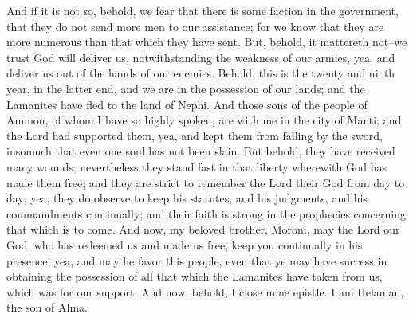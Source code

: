 And if it is not so, behold, we fear that there is some faction in the government, that they do not send more men to our assistance; for we know that they are more numerous than that which they have sent.
\bverse \iffalse But, behold, it mattereth not--we trust God will deliver us, notwithstanding the weakness of our armies, yea, and deliver us out of the hands of our enemies. \fi
But, behold, it mattereth not--we trust God will deliver us, notwithstanding the weakness of our armies, yea, and deliver us out of the hands of our enemies.
\bverse \iffalse Behold, this is the twenty and ninth year, in the latter end, and we are in the possession of our lands; and the Lamanites have fled to the land of Nephi. \fi
Behold, this is the twenty and ninth year, in the latter end, and we are in the possession of our lands; and the Lamanites have fled to the land of Nephi.
\bverse \iffalse And those sons of the people of Ammon, of whom I have so highly spoken, are with me in the city of Manti; and the Lord had supported them, yea, and kept them from falling by the sword, insomuch that even one soul has not been slain. \fi
And those sons of the people of Ammon, of whom I have so highly spoken, are with me in the city of Manti; and the Lord had supported them, yea, and kept them from falling by the sword, insomuch that even one soul has not been slain.
\bverse \iffalse But behold, they have received many wounds; nevertheless they stand fast in that liberty wherewith God has made them free; and they are strict to remember the Lord their God from day to day; yea, they do observe to keep his statutes, and his judgments, and his commandments continually; and their faith is strong in the prophecies concerning that which is to come. \fi
But behold, they have received many wounds; nevertheless they stand fast in that liberty wherewith God has made them free; and they are strict to remember the Lord their God from day to day; yea, they do observe to keep his statutes, and his judgments, and his commandments continually; and their faith is strong in the prophecies concerning that which is to come.
\bverse \iffalse And now, my beloved brother, Moroni, may the Lord our God, who has redeemed us and made us free, keep you continually in his presence; yea, and may he favor this people, even that ye may have success in obtaining the possession of all that which the Lamanites have taken from us, which was for our support. And now, behold, I close mine epistle. I am Helaman, the son of Alma. \fi
And now, my beloved brother, Moroni, may the Lord our God, who has redeemed us and made us free, keep you continually in his presence; yea, and may he favor this people, even that ye may have success in obtaining the possession of all that which the Lamanites have taken from us, which was for our support. And now, behold, I close mine epistle. I am Helaman, the son of Alma.
